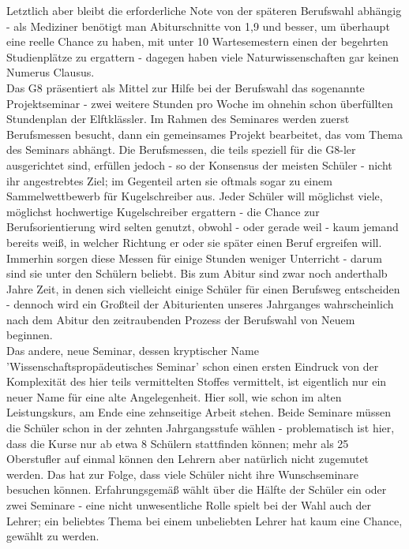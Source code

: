 \documentclass[a4paper,12pt,twoside]{scrbook}
\begin{document}
Letztlich aber bleibt die erforderliche Note von der späteren Berufswahl abhängig - als Mediziner benötigt man Abiturschnitte von 1,9 und besser, um überhaupt eine reelle Chance zu haben, mit unter 10 Wartesemestern einen der begehrten Studienplätze zu ergattern - dagegen haben viele Naturwissenschaften gar keinen Numerus Clausus.
\\
Das G8 präsentiert als Mittel zur Hilfe bei der Berufswahl das sogenannte Projektseminar - zwei weitere Stunden pro Woche im ohnehin schon überfüllten Stundenplan der Elftklässler. Im Rahmen des Seminares werden zuerst Berufsmessen besucht, dann ein gemeinsames Projekt bearbeitet, das vom Thema des Seminars abhängt. Die Berufsmessen, die teils speziell für die G8-ler ausgerichtet sind, erfüllen jedoch - so der Konsensus der meisten Schüler - nicht ihr angestrebtes Ziel; im Gegenteil arten sie oftmals sogar zu einem Sammelwettbewerb für Kugelschreiber aus. Jeder Schüler will möglichst viele, möglichst hochwertige Kugelschreiber ergattern - die Chance zur Berufsorientierung wird selten genutzt, obwohl - oder gerade weil - kaum jemand bereits weiß, in welcher Richtung er oder sie später einen Beruf ergreifen will. Immerhin sorgen diese Messen für einige Stunden weniger Unterricht - darum sind sie unter den Schülern beliebt. Bis zum Abitur sind zwar noch anderthalb Jahre Zeit, in denen sich vielleicht einige Schüler für einen Berufsweg entscheiden - dennoch wird ein Großteil der Abiturienten unseres Jahrganges wahrscheinlich nach dem Abitur den zeitraubenden Prozess der Berufswahl von Neuem beginnen.
\\
Das andere, neue Seminar, dessen kryptischer Name 'Wissenschaftspropädeutisches Seminar' schon einen ersten Eindruck von der Komplexität des hier teils vermittelten Stoffes vermittelt, ist eigentlich nur ein neuer Name für eine alte Angelegenheit. Hier soll, wie schon im alten Leistungskurs, am Ende eine zehnseitige Arbeit stehen. Beide Seminare müssen die Schüler schon in der zehnten Jahrgangsstufe wählen - problematisch ist hier, dass die Kurse nur ab etwa 8 Schülern stattfinden können; mehr als 25 Oberstufler auf einmal können den Lehrern aber natürlich nicht zugemutet werden. Das hat zur Folge, dass viele Schüler nicht ihre Wunschseminare besuchen können. Erfahrungsgemäß wählt über die Hälfte der Schüler ein oder zwei Seminare - eine nicht unwesentliche Rolle spielt bei der Wahl auch der Lehrer; ein beliebtes Thema bei einem unbeliebten Lehrer hat kaum eine Chance, gewählt zu werden.
\\
\end{document}
